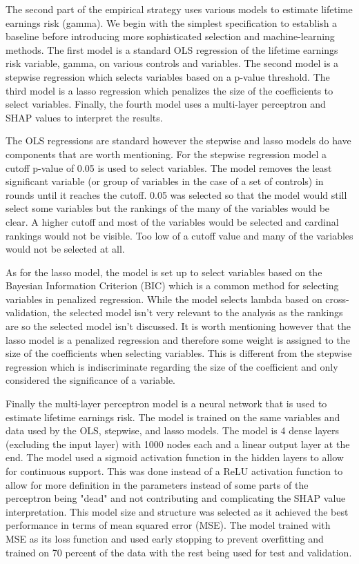 \documentclass[12pt]{article}
\begin{document}
\begin{onehalfspace}
The second part of the empirical strategy uses various models to estimate lifetime earnings risk (gamma). We begin with the simplest specification to establish a baseline before introducing more sophisticated selection and machine-learning methods. The first model is a standard OLS regression of the lifetime earnings risk variable, gamma, on various controls and variables. The second model is a stepwise regression which selects variables based on a p-value threshold. The third model is a lasso regression which penalizes the size of the coefficients to select variables. Finally, the fourth model uses a multi-layer perceptron and SHAP values to interpret the results.

The OLS regressions are standard however the stepwise and lasso models do have components that are worth mentioning. For the stepwise regression model a cutoff p-value of 0.05 is used to select variables. The model removes the least significant variable (or group of variables in the case of a set of controls) in rounds until it reaches the cutoff. 0.05 was selected so that the model would still select some variables but the rankings of the many of the variables would be clear. A higher cutoff and most of the variables would be selected and cardinal rankings would not be visible. Too low of a cutoff value and many of the variables would not be selected at all. 

As for the lasso model, the model is set up to select variables based on the Bayesian Information Criterion (BIC) which is a common method for selecting variables in penalized regression. While the model selects lambda based on cross-validation, the selected model isn't very relevant to the analysis as the rankings are so the selected model isn't discussed. It is worth mentioning however that the lasso model is a penalized regression and therefore some weight is assigned to the size of the coefficients when selecting variables. This is different from the stepwise regression which is indiscriminate regarding the size of the coefficient and only considered the significance of a variable.

Finally the multi-layer perceptron model is a neural network that is used to estimate lifetime earnings risk. The model is trained on the same variables and data used by the OLS, stepwise, and lasso models. The model is 4 dense layers (excluding the input layer) with 1000 nodes each and a linear output layer at the end. The model used a sigmoid activation function in the hidden layers to allow for continuous support. This was done instead of a ReLU activation function to allow for more definition in the parameters instead of some parts of the perceptron being "dead" and not contributing and complicating the SHAP value interpretation. This model size and structure was selected as it achieved the best performance in terms of mean squared error (MSE). The model trained with MSE as its loss function and used early stopping to prevent overfitting and trained on 70 percent of the data with the rest being used for test and validation.


\end{onehalfspace}
\end{document}
